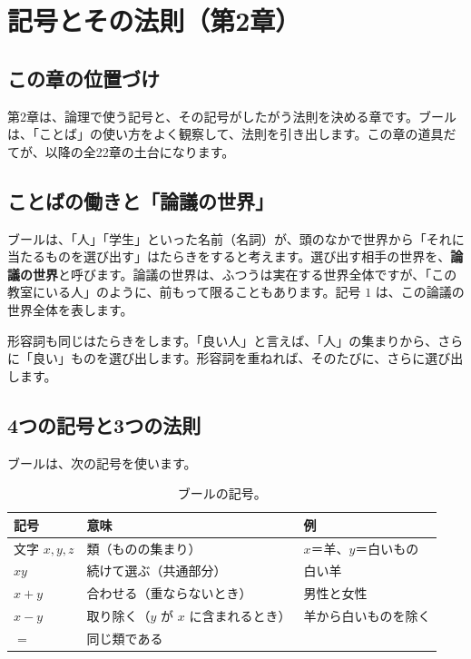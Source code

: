 \documentclass[a4paper,11pt,openany]{ltjsbook}
\begin{document}
\chapter{記号とその法則（第2章）}

\section{この章の位置づけ}

第2章は、論理で使う記号と、その記号がしたがう法則を決める章です。ブールは、「ことば」の使い方をよく観察して、法則を引き出します。この章の道具だてが、以降の全22章の土台になります。

\section{ことばの働きと「論議の世界」}

ブールは、「人」「学生」といった名前（名詞）が、頭のなかで世界から「それに当たるものを選び出す」はたらきをすると考えます。選び出す相手の世界を、\textbf{論議の世界}と呼びます。論議の世界は、ふつうは実在する世界全体ですが、「この教室にいる人」のように、前もって限ることもあります。記号 $1$ は、この論議の世界全体を表します。

形容詞も同じはたらきをします。「良い人」と言えば、「人」の集まりから、さらに「良い」ものを選び出します。形容詞を重ねれば、そのたびに、さらに選び出します。

\section{4つの記号と3つの法則}

ブールは、次の記号を使います。

\begin{table}[htbp]
\centering
\begin{tabular}{lll}
\toprule
記号 & 意味 & 例\\
\midrule
文字 $x,y,z$ & 類（ものの集まり） & $x$＝羊、$y$＝白いもの\\
$xy$ & 続けて選ぶ（共通部分） & 白い羊\\
$x+y$ & 合わせる（重ならないとき） & 男性と女性\\
$x-y$ & 取り除く（$y$ が $x$ に含まれるとき） & 羊から白いものを除く\\
$=$ & 同じ類である & \\
\bottomrule
\end{tabular}
\caption{ブールの記号。}
\end{table}
\end{document}
